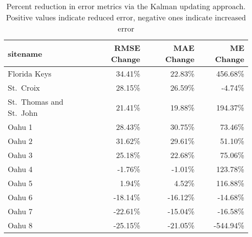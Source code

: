 \begin{table}[htbp]
\centering
\caption[Summary of percent change in error metrics for each test site]{Percent reduction in error metrics via the Kalman updating approach. Positive values indicate reduced error, negative ones indicate increased error}
\label{tab:allsite-percent-change}
\begin{tabular}{lrrr}
\toprule
 
sitename & RMSE Change & MAE Change & ME Change \\
\midrule
Florida Keys & 34.41\% & 22.83\% & 456.68\% \\
St.~Croix & 28.15\% & 26.59\% & -4.74\% \\
St.~Thomas and St.~John & 21.41\% & 19.88\% & 194.37\% \\
Oahu 1 & 28.43\% & 30.75\% & 73.46\% \\
Oahu 2 & 31.62\% & 29.61\% & 51.10\% \\
Oahu 3 & 25.18\% & 22.68\% & 75.06\% \\
Oahu 4 & -1.76\% & -1.01\% & 123.78\% \\
Oahu 5 & 1.94\% & 4.52\% & 116.88\% \\
Oahu 6 & -18.14\% & -16.12\% & -14.68\% \\
Oahu 7 & -22.61\% & -15.04\% & -16.58\% \\
Oahu 8 & -25.15\% & -21.05\% & -544.94\% \\
\bottomrule
\end{tabular}
\end{table}
